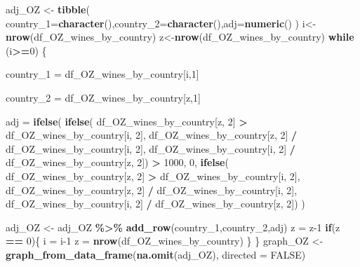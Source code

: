 \documentclass[
]{article}
\newenvironment{Shaded}{\begin{snugshade}}{\end{snugshade}}
\newcommand{\AttributeTok}[1]{\textcolor[rgb]{0.13,0.29,0.53}{#1}}
\newcommand{\ConstantTok}[1]{\textcolor[rgb]{0.56,0.35,0.01}{#1}}
\newcommand{\ControlFlowTok}[1]{\textcolor[rgb]{0.13,0.29,0.53}{\textbf{#1}}}
\newcommand{\DecValTok}[1]{\textcolor[rgb]{0.00,0.00,0.81}{#1}}
\newcommand{\FunctionTok}[1]{\textcolor[rgb]{0.13,0.29,0.53}{\textbf{#1}}}
\newcommand{\NormalTok}[1]{#1}
\newcommand{\OtherTok}[1]{\textcolor[rgb]{0.56,0.35,0.01}{#1}}
\newcommand{\SpecialCharTok}[1]{\textcolor[rgb]{0.81,0.36,0.00}{\textbf{#1}}}
\begin{document}
\begin{Shaded}
\begin{Highlighting}[]
\NormalTok{adj\_OZ }\OtherTok{\textless{}{-}} \FunctionTok{tibble}\NormalTok{( }\AttributeTok{country\_1=}\FunctionTok{character}\NormalTok{(),}\AttributeTok{country\_2=}\FunctionTok{character}\NormalTok{(),}\AttributeTok{adj=}\FunctionTok{numeric}\NormalTok{()}
\NormalTok{)}
\NormalTok{i}\OtherTok{\textless{}{-}}\FunctionTok{nrow}\NormalTok{(df\_OZ\_wines\_by\_country)}
\NormalTok{z}\OtherTok{\textless{}{-}}\FunctionTok{nrow}\NormalTok{(df\_OZ\_wines\_by\_country)}
\ControlFlowTok{while}\NormalTok{ (i}\SpecialCharTok{\textgreater{}=}\DecValTok{0}\NormalTok{) \{}
  
  
\NormalTok{    country\_1 }\OtherTok{=}\NormalTok{ df\_OZ\_wines\_by\_country[i,}\DecValTok{1}\NormalTok{]}
    
\NormalTok{    country\_2 }\OtherTok{=}\NormalTok{ df\_OZ\_wines\_by\_country[z,}\DecValTok{1}\NormalTok{]}
    
\NormalTok{    adj }\OtherTok{=} 
      \FunctionTok{ifelse}\NormalTok{(      }
        \FunctionTok{ifelse}\NormalTok{(}
\NormalTok{          df\_OZ\_wines\_by\_country[z, }\DecValTok{2}\NormalTok{] }\SpecialCharTok{\textgreater{}}\NormalTok{ df\_OZ\_wines\_by\_country[i, }\DecValTok{2}\NormalTok{],}
\NormalTok{                 df\_OZ\_wines\_by\_country[z, }\DecValTok{2}\NormalTok{] }\SpecialCharTok{/}\NormalTok{ df\_OZ\_wines\_by\_country[i, }\DecValTok{2}\NormalTok{],}
\NormalTok{                 df\_OZ\_wines\_by\_country[i, }\DecValTok{2}\NormalTok{] }\SpecialCharTok{/}\NormalTok{ df\_OZ\_wines\_by\_country[z, }\DecValTok{2}\NormalTok{]) }\SpecialCharTok{\textgreater{}} \DecValTok{1000}\NormalTok{,}
        \DecValTok{0}\NormalTok{, }
        \FunctionTok{ifelse}\NormalTok{(}
\NormalTok{          df\_OZ\_wines\_by\_country[z, }\DecValTok{2}\NormalTok{] }\SpecialCharTok{\textgreater{}}\NormalTok{ df\_OZ\_wines\_by\_country[i, }\DecValTok{2}\NormalTok{],}
\NormalTok{                 df\_OZ\_wines\_by\_country[z, }\DecValTok{2}\NormalTok{] }\SpecialCharTok{/}\NormalTok{ df\_OZ\_wines\_by\_country[i, }\DecValTok{2}\NormalTok{],}
\NormalTok{                 df\_OZ\_wines\_by\_country[i, }\DecValTok{2}\NormalTok{] }\SpecialCharTok{/}\NormalTok{ df\_OZ\_wines\_by\_country[z, }\DecValTok{2}\NormalTok{])}
\NormalTok{      )}
    
 

\NormalTok{adj\_OZ }\OtherTok{\textless{}{-}}\NormalTok{ adj\_OZ }\SpecialCharTok{\%\textgreater{}\%} \FunctionTok{add\_row}\NormalTok{(country\_1,country\_2,adj)}
\NormalTok{    z }\OtherTok{=}\NormalTok{ z}\DecValTok{{-}1}
  \ControlFlowTok{if}\NormalTok{(z }\SpecialCharTok{==} \DecValTok{0}\NormalTok{)\{}
\NormalTok{    i }\OtherTok{=}\NormalTok{ i}\DecValTok{{-}1}
\NormalTok{    z }\OtherTok{=} \FunctionTok{nrow}\NormalTok{(df\_OZ\_wines\_by\_country)}
\NormalTok{  \}}
\NormalTok{\}}
\NormalTok{graph\_OZ }\OtherTok{\textless{}{-}} \FunctionTok{graph\_from\_data\_frame}\NormalTok{(}\FunctionTok{na.omit}\NormalTok{(adj\_OZ), }\AttributeTok{directed =} \ConstantTok{FALSE}\NormalTok{)}


\end{Highlighting}
\end{Shaded}
\end{document}

